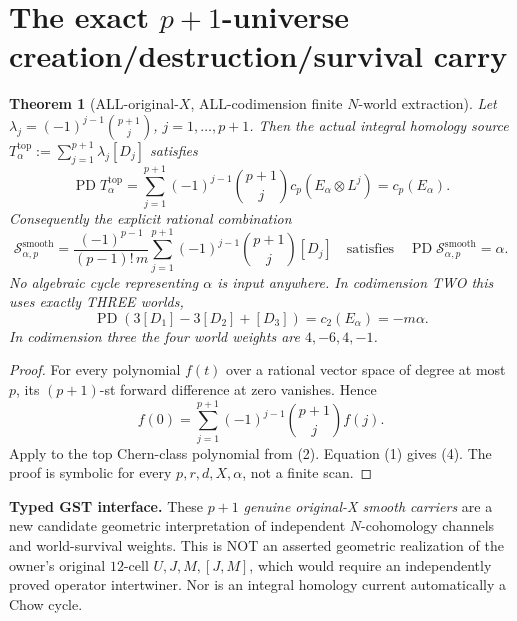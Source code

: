 \documentclass[11pt]{article}
\newtheorem{theorem}{Theorem}[section]
\newcommand{\PD}{\operatorname{PD}}
\begin{document}
\section{The exact \(p+1\)-universe creation/destruction/survival carry}
\begin{theorem}[ALL-original-\(X\), ALL-codimension finite \(N\)-world extraction]
Let \(\lambda_j=(-1)^{j-1}\binom{p+1}{j}\), \(j=1,\ldots,p+1\). Then the \emph{actual integral homology source} \(T_\alpha^{\mathrm{top}}:=\sum_{j=1}^{p+1}\lambda_j[D_j]\) satisfies
\[
\boxed{\PD T_\alpha^{\mathrm{top}}
=\sum_{j=1}^{p+1}(-1)^{j-1}\binom{p+1}{j}c_p(E_\alpha\otimes L^j)
=c_p(E_\alpha).}\tag{3}
\]
Consequently the explicit rational combination
\[
\boxed{\mathcal S_{\alpha,p}^{\mathrm{smooth}}
=\frac{(-1)^{p-1}}{(p-1)!\,m}
\sum_{j=1}^{p+1}(-1)^{j-1}\binom{p+1}{j}[D_j]}
\quad\text{satisfies}\quad
\boxed{\PD\mathcal S_{\alpha,p}^{\mathrm{smooth}}=\alpha.}\tag{4}
\]
No algebraic cycle representing \(\alpha\) is input anywhere. In codimension TWO this uses exactly THREE worlds,
\[
\boxed{\PD(3[D_1]-3[D_2]+[D_3])=c_2(E_\alpha)=-m\alpha.}\tag{5}
\]
In codimension three the four world weights are \(4,-6,4,-1\).
\end{theorem}
\begin{proof}
For every polynomial \(f(t)\) over a rational vector space of degree at most \(p\), its \((p+1)\)-st forward difference at zero vanishes. Hence
\[
f(0)=\sum_{j=1}^{p+1}(-1)^{j-1}\binom{p+1}{j}f(j).
\]
Apply to the top Chern-class polynomial from (2). Equation (1) gives (4). The proof is symbolic for every \(p,r,d,X,\alpha\), not a finite scan.
\end{proof}
\noindent\textbf{Typed GST interface.} These \(p+1\) \emph{genuine original-X smooth carriers} are a new candidate geometric interpretation of independent \(N\)-cohomology channels and world-survival weights. This is NOT an asserted geometric realization of the owner's original \(12\)-cell \(U,J,M,[J,M]\), which would require an independently proved operator intertwiner. Nor is an integral homology current automatically a Chow cycle.
\end{document}
